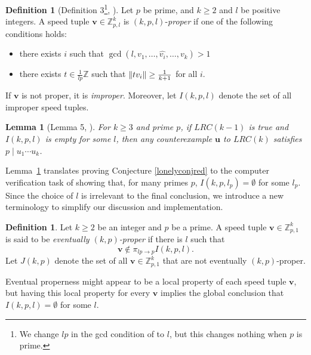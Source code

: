\documentclass[11pt]{amsart}
\DeclarePairedDelimiter\norm{\lVert}{\rVert}
\newcommand{\Z}{\mathbb{Z}}
\newcommand{\vbf}{\mathbf{v}}
\newcommand{\ubf}{\mathbf{u}}
\newtheorem{lemma}[theorem]{Lemma}
\theoremstyle{definition}
\newtheorem{definition}[theorem]{Definition}
\theoremstyle{remark}
\begin{document}
\begin{definition}[Definition 3\footnote{We change $lp$ in the gcd condition of \cite{Trakulthongchai} to $l$,
  but this changes nothing when $p$ is prime.}, \cite{Trakulthongchai}]\label{def:improper}
    Let $p$ be prime, and $k \geq 2$ and $l$ be positive integers.
    A speed tuple $\vbf\in\Z_{p,l}^k$ is $(k,p,l)$-\emph{proper} if one of the following conditions holds: 
  \begin{itemize}
    \item there exists $i$ such that $\gcd(l, v_1, \dots, \widehat{v_{i}}, \dots, v_k) > 1$
    \item there exists $t \in\frac{1}{lp}\Z$ such that $\norm{tv_i} \geq \frac{1}{k+1}$ for all $i$.
  \end{itemize}
   If $\vbf$ is not proper, it is \emph{improper}. Moreover, let $I(k,p,l)$ denote the set of all improper speed tuples.
\end{definition}

\begin{lemma}[Lemma 5, \cite{Trakulthongchai}] \label{lem:divp}
    For $k\geq3$ and prime $p$, if $LRC(k-1)$ is true and $I(k,p,l)$ is empty for some $l$, then any counterexample
    $\ubf$ to $LRC(k)$ satisfies $p \mid u_1 \cdots u_k$. 
\end{lemma}

Lemma~\ref{lem:divp} translates proving Conjecture \ref{lonelyconjred} to the computer verification task
of showing that, for many primes $p$, $I(k,p,l_p)=\emptyset$ for some $l_p$.
Since the choice of $l$ is irrelevant to the final conclusion, 
we introduce a new terminology to simplify our discussion and implementation. 
\begin{definition}
  \label{def:eventualproper}
  Let $k \geq 2$ be an integer and $p$ be a prime. 
  A speed tuple $\vbf \in \Z_{p,1}^k$ is said to be \emph{eventually $(k,p)$-proper}
  if there is $l$ such 
  that \[ \vbf \notin \pi_{lp \to p} I(k, p, l). \]
  Let $J(k,p)$ denote the set of all $\vbf \in \Z_{p,1}^k$ that are not eventually $(k,p)$-proper.
\end{definition}

Eventual properness might appear to be a local property of each speed tuple $\vbf$,
but having this local property for every $\vbf$ implies the global conclusion that $I(k,p,l)=\emptyset$ for some $l$.
\end{document}
